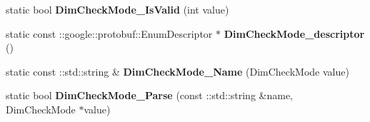 \begin{DoxyCompactItemize}
\item 
\mbox{\label{classcaffe_1_1_v1_layer_parameter_a5e1e0fd77a900307debbff4701297002}} 
static bool {\bfseries Dim\+Check\+Mode\+\_\+\+Is\+Valid} (int value)
\item 
\mbox{\label{classcaffe_1_1_v1_layer_parameter_a2aaf4ecfa539ff5724bc7c473561f137}} 
static const \+::google\+::protobuf\+::\+Enum\+Descriptor $\ast$ {\bfseries Dim\+Check\+Mode\+\_\+descriptor} ()
\item 
\mbox{\label{classcaffe_1_1_v1_layer_parameter_a3be01204bde8d8913476148ee86f20c5}} 
static const \+::std\+::string \& {\bfseries Dim\+Check\+Mode\+\_\+\+Name} (Dim\+Check\+Mode value)
\item 
\mbox{\label{classcaffe_1_1_v1_layer_parameter_a50080bb786404e703ea929af876289a7}} 
static bool {\bfseries Dim\+Check\+Mode\+\_\+\+Parse} (const \+::std\+::string \&name, Dim\+Check\+Mode $\ast$value)
\end{DoxyCompactItemize}
